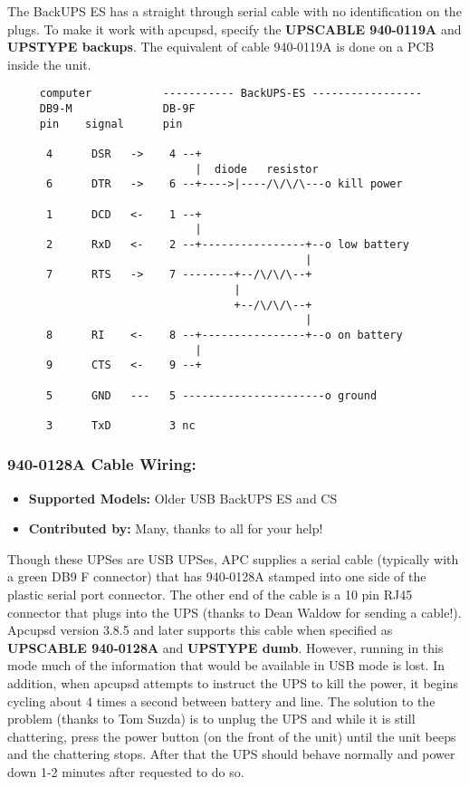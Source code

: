 The BackUPS ES has a straight through serial cable with no identification on
the plugs. To make it work with apcupsd, specify the {\bf UPSCABLE 940-0119A}
and {\bf UPSTYPE backups}.  The equivalent of cable 940-0119A is done on a PCB
inside the unit.

\footnotesize
\begin{verbatim}
     computer           ----------- BackUPS-ES -----------------
     DB9-M              DB-9F
     pin    signal      pin
     
      4      DSR   ->    4 --+
                             |  diode   resistor
      6      DTR   ->    6 --+---->|----/\/\/\---o kill power
     
      1      DCD   <-    1 --+
                             |
      2      RxD   <-    2 --+----------------+--o low battery
                                              |
      7      RTS   ->    7 --------+--/\/\/\--+
                                   |
                                   +--/\/\/\--+
                                              |
      8      RI    <-    8 --+----------------+--o on battery
                             |
      9      CTS   <-    9 --+
     
      5      GND   ---   5 ----------------------o ground
     
      3      TxD         3 nc
\end{verbatim}
\normalsize

\subsubsection*{940-0128A Cable Wiring:}

\begin{itemize}
\item {\bf Supported Models:} Older USB BackUPS ES and CS 
\item {\bf Contributed by:} Many, thanks to all for your help!
\end{itemize}

Though these UPSes are USB UPSes, APC supplies a serial cable (typically with
a green DB9 F connector) that has 940-0128A stamped into one side of the
plastic serial port connector. The other end of the cable is a 10 pin RJ45
connector that plugs into the UPS (thanks to Dean Waldow for sending a
cable!). Apcupsd version 3.8.5 and later supports this cable when specified as
{\bf UPSCABLE 940-0128A} and {\bf UPSTYPE dumb}. However, running in this
mode much of the information that would be available in USB mode is lost. In
addition, when apcupsd attempts to instruct the UPS to kill the power, it
begins cycling about 4 times a second between battery and line. The solution
to the problem (thanks to Tom Suzda) is to unplug the UPS and while it is
still chattering, press the power button (on the front of the unit) until the
unit beeps and the chattering stops. After that the UPS should behave normally
and power down 1-2 minutes after requested to do so.  

